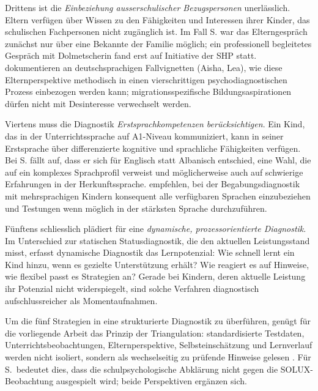 \documentclass[ngerman, a4paper]{article}
\begin{document}
Drittens ist die \textit{Einbeziehung ausserschulischer Bezugspersonen} unerlässlich.
Eltern verfügen über Wissen zu den Fähigkeiten und Interessen ihrer Kinder, das
schulischen Fachpersonen nicht zugänglich ist. Im Fall S. war das Elterngespräch zunächst
nur über eine Bekannte der Familie möglich; ein professionell begleitetes Gespräch mit
Dolmetscherin fand erst auf Initiative der SHP statt.
\textcite[S.\,239--249]{gauckreimann2021psychdiagnostik} dokumentieren an
deutschsprachigen Fallvignetten (Aisha, Lea), wie diese Elternperspektive
methodisch in einen vier­schrittigen psychodiagnostischen Prozess
einbezogen werden kann; migrationsspezifische Bildungsaspirationen dürfen
nicht mit Desinteresse verwechselt werden.

Viertens muss die Diagnostik \textit{Erstsprachkompetenzen berücksichtigen}. Ein Kind,
das in der Unterrichtssprache auf A1-Niveau kommuniziert, kann in seiner Erstsprache
über differenzierte kognitive und sprachliche Fähigkeiten verfügen. Bei S. fällt auf,
dass er sich für Englisch statt Albanisch entschied, eine Wahl, die auf ein komplexes
Sprachprofil verweist und möglicherweise auch auf schwierige Erfahrungen in der
Herkunftssprache. \textcite[S.\,76--78]{kellerkoller2025hellekoepfe}
empfehlen, bei der Begabungsdiagnostik mit mehrsprachigen Kindern konsequent
alle verfügbaren Sprachen einzubeziehen und Testungen wenn möglich in der
stärksten Sprache durchzuführen.

Fünftens schliesslich plädiert
\textcite[S.\,224--235]{muelleroppliger2021paeddiagnostik} für eine
\textit{dynamische, prozessorientierte Diagnostik}. Im Unterschied zur
statischen Statusdiagnostik, die den aktuellen Leistungsstand misst,
erfasst dynamische Diagnostik das Lernpotenzial: Wie schnell lernt ein
Kind hinzu, wenn es gezielte Unterstützung erhält? Wie reagiert es auf
Hinweise, wie flexibel passt es Strategien an? Gerade bei Kindern,
deren aktuelle Leistung ihr Potenzial nicht widerspiegelt, sind solche
Verfahren diagnostisch aufschlussreicher als Momentaufnahmen.

Um die fünf Strategien in eine strukturierte Diagnostik zu überführen,
genügt für die vorliegende Arbeit das Prinzip der Triangulation:
standardisierte Testdaten, Unterrichtsbeobachtungen, Elternperspektive,
Selbsteinschätzung und Lernverlauf werden nicht isoliert, sondern als
wechselseitig zu prüfende Hinweise gelesen
\parencite[S.\,230--234]{muelleroppliger2021paeddiagnostik}.
Für S.\ bedeutet dies, dass die schulpsychologische Abklärung nicht
gegen die SOLUX-Beobachtung ausgespielt wird; beide Perspektiven
ergänzen sich.
\end{document}
